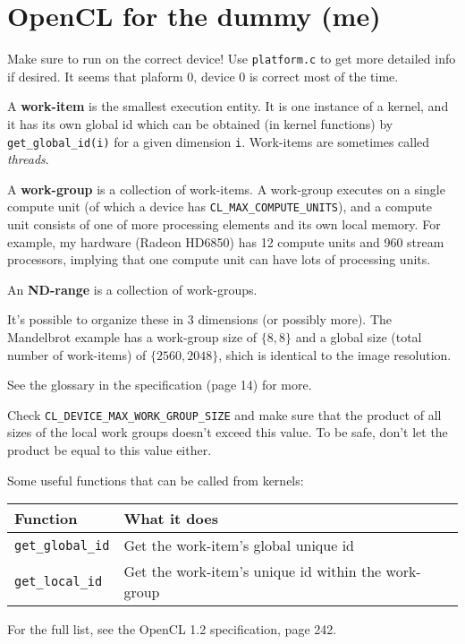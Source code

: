 \documentclass[a4paper,11pt]{article}
\begin{document}
\section*{OpenCL for the dummy (me)}

Make sure to run on the correct device! Use \texttt{platform.c} to get more detailed info if desired. It seems that plaform 0, device 0 is correct most of the time.

A {\bf work-item} is the smallest execution entity. It is one instance of a kernel, and it has its own global id which can be obtained (in kernel functions) by \texttt{get\_global\_id(i)} for a given dimension \texttt{i}. Work-items are sometimes called \emph{threads}.

A {\bf work-group} is a collection of work-items. A work-group executes on a single compute unit (of which a device has \texttt{CL\_MAX\_COMPUTE\_UNITS}), and a compute unit consists of one of more processing elements and its own local memory. For example, my hardware (Radeon HD6850) has 12 compute units and 960 stream processors, implying that one compute unit can have lots of processing units.

An {\bf ND-range} is a collection of work-groups.

It's possible to organize these in 3 dimensions (or possibly more). The Mandelbrot example has a work-group size of $\{8,8\}$ and a global size (total number of work-items) of $\{2560,2048\}$, shich is identical to the image resolution.

See the glossary in the specification (page 14) for more.

Check \texttt{CL\_DEVICE\_MAX\_WORK\_GROUP\_SIZE} and make sure that the product of all sizes of the local work groups doesn't exceed this value. To be safe, don't let the product be equal to this value either.

Some useful functions that can be called from kernels:

\begin{tabular}{|l|l|}
	\hline
	{\bf Function} & {\bf What it does} \\
	\hline
	\texttt{get\_global\_id} & Get the work-item's global unique id \\
	\texttt{get\_local\_id} & Get the work-item's unique id within the work-group \\
	\hline
\end{tabular}

For the full list, see the OpenCL 1.2 specification, page 242.
\end{document}
